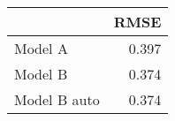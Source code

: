 
\begin{tabular}{l|r}
\hline
  & RMSE\\
\hline
Model A & 0.397\\
\hline
Model B & 0.374\\
\hline
Model B auto & 0.374\\
\hline
\end{tabular}